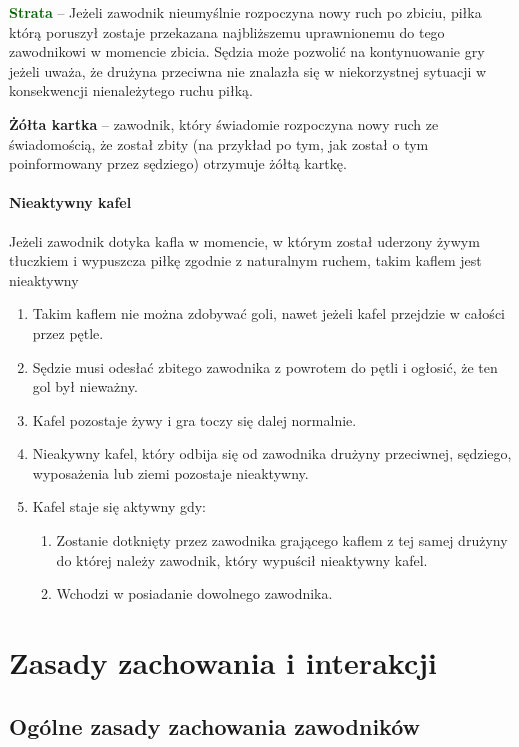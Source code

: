 \documentclass[12pt]{article}
\newcommand\yellowcard[1]{\bgroup\textcolor{darkyellow}{\textbf{#1}}}
\newcommand\other[1]{\bgroup\textcolor{darkgreen}{\textbf{#1}}}
\begin{document}
\other{Strata} -- Jeżeli zawodnik nieumyślnie rozpoczyna nowy ruch po
zbiciu, piłka którą poruszył zostaje przekazana najbliższemu
uprawnionemu do tego zawodnikowi w momencie zbicia. Sędzia może pozwolić
na kontynuowanie gry jeżeli uważa, że drużyna przeciwna nie znalazła się
w niekorzystnej sytuacji w konsekwencji nienależytego ruchu piłką.

\yellowcard{Żółta kartka} -- zawodnik, który świadomie rozpoczyna nowy ruch ze
świadomością, że został zbity (na przykład po tym, jak został o tym
poinformowany przez sędziego) otrzymuje żółtą kartkę.

\paragraph{Nieaktywny kafel}
Jeżeli zawodnik dotyka kafla w
momencie, w którym został uderzony żywym tłuczkiem i wypuszcza piłkę
zgodnie z naturalnym ruchem, takim kaflem jest nieaktywny

\begin{enumerate}
	\item
	      Takim kaflem nie można zdobywać goli, nawet jeżeli kafel przejdzie w
	      całości przez pętle.
	\item
	      Sędzie musi odesłać zbitego zawodnika z powrotem do pętli i ogłosić,
	      że ten gol był nieważny.
	\item
	      Kafel pozostaje żywy i gra toczy się dalej normalnie.
	\item
	      Nieakywny kafel, który odbija się od zawodnika drużyny przeciwnej,
	      sędziego, wyposażenia lub ziemi pozostaje nieaktywny.
	\item
	      Kafel staje się aktywny gdy:

	      \begin{enumerate}
		      \item
		            Zostanie dotknięty przez zawodnika grającego kaflem z tej samej
		            drużyny do której należy zawodnik, który wypuścił nieaktywny kafel.
		      \item
		            Wchodzi w posiadanie dowolnego zawodnika.
	      \end{enumerate}
\end{enumerate}

\pagebreak
\section{Zasady zachowania i interakcji}

\subsection{Ogólne zasady zachowania zawodników}
\end{document}
